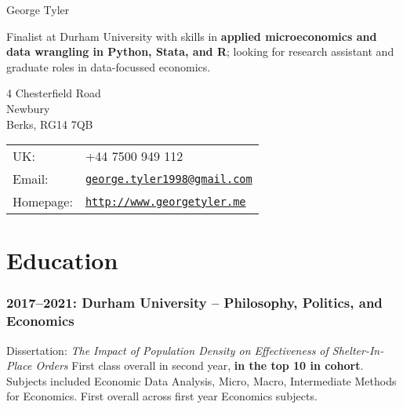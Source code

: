 \documentclass[letterpaper]{article}
\def\name{George Tyler}
\renewenvironment{itemize}{
  \begin{list}{}{
    \setlength{\leftmargin}{1.5em}
  }
}{
  \end{list}
}
\begin{document}
{\huge \name}


\vspace{0.25in}

Finalist at Durham University with skills in \textbf{applied microeconomics and data wrangling in Python, Stata, and R}; looking for research assistant and graduate roles in data-focussed economics.

\vspace{0.25in}

\begin{minipage}{0.45\linewidth}
  4 Chesterfield Road \\
  Newbury \\
  Berks, RG14 7QB
\end{minipage}
\begin{minipage}{0.45\linewidth}
  \begin{tabular}{ll}
    UK: & +44 7500 949 112 \\
    Email: & \href{mailto:george.tyler1998@gmail.com}{\tt george.tyler1998@gmail.com} \\
    Homepage: & \href{http://www.georgetyler.me}{\tt http://www.georgetyler.me} \\
  \end{tabular}
\end{minipage}





\section*{Education}

\subsubsection*{2017--2021: Durham University -- Philosophy, Politics, and Economics}
Dissertation: \textit{The Impact of Population Density on Effectiveness of Shelter-In-Place Orders} \newline
First class overall in second year, \textbf{in the top 10 in cohort}. Subjects included Economic Data Analysis, Micro, Macro, Intermediate Methods for Economics. First overall across first year Economics subjects. 
\end{document}
